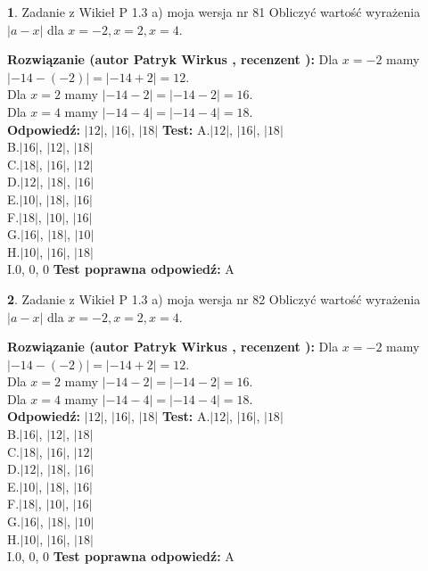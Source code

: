 \documentclass[12pt, a4paper]{article}
\theoremstyle{definition} %
\newtheorem{zad}{}
\newcommand{\zadStart}[1]{\begin{zad}#1\newline}
\newcommand{\zadStop}{\end{zad}}
\newcommand{\rozwStart}[2]{\noindent \textbf{Rozwiązanie (autor #1 , recenzent #2): }\newline}
\newcommand{\rozwStop}{\newline}
\newcommand{\odpStart}{\noindent \textbf{Odpowiedź:}\newline}
\newcommand{\odpStop}{\newline}
\newcommand{\testStart}{\noindent \textbf{Test:}\newline}
\newcommand{\testStop}{\newline}
\newcommand{\kluczStart}{\noindent \textbf{Test poprawna odpowiedź:}\newline}
\newcommand{\kluczStop}{\newline}
\begin{document}
\zadStart{Zadanie z Wikieł P 1.3 a) moja wersja nr 81}
Obliczyć wartość wyrażenia $|a - x|$ dla $x=-2,x=2,x=4$.
\zadStop
\rozwStart{Patryk Wirkus}{}
Dla $x = -2$ mamy $|-14 - (-2)| = |-14 + 2| = 12$.\\
Dla $x = 2$ mamy $|-14 - 2| = |-14 - 2| = 16$.\\
Dla $x = 4$ mamy $|-14 - 4| = |-14 - 4| = 18$.\\
\rozwStop
\odpStart
$|12|$, $|16|$, $|18|$
\odpStop
\testStart
A.$|12|$, $|16|$, $|18|$\\
B.$|16|$, $|12|$, $|18|$\\
C.$|18|$, $|16|$, $|12|$\\
D.$|12|$, $|18|$, $|16|$\\
E.$|10|$, $|18|$, $|16|$\\
F.$|18|$, $|10|$, $|16|$\\
G.$|16|$, $|18|$, $|10|$\\
H.$|10|$, $|16|$, $|18|$\\
I.$0$, $0$, $0$
\testStop
\kluczStart
A
\kluczStop



\zadStart{Zadanie z Wikieł P 1.3 a) moja wersja nr 82}
Obliczyć wartość wyrażenia $|a - x|$ dla $x=-2,x=2,x=4$.
\zadStop
\rozwStart{Patryk Wirkus}{}
Dla $x = -2$ mamy $|-14 - (-2)| = |-14 + 2| = 12$.\\
Dla $x = 2$ mamy $|-14 - 2| = |-14 - 2| = 16$.\\
Dla $x = 4$ mamy $|-14 - 4| = |-14 - 4| = 18$.\\
\rozwStop
\odpStart
$|12|$, $|16|$, $|18|$
\odpStop
\testStart
A.$|12|$, $|16|$, $|18|$\\
B.$|16|$, $|12|$, $|18|$\\
C.$|18|$, $|16|$, $|12|$\\
D.$|12|$, $|18|$, $|16|$\\
E.$|10|$, $|18|$, $|16|$\\
F.$|18|$, $|10|$, $|16|$\\
G.$|16|$, $|18|$, $|10|$\\
H.$|10|$, $|16|$, $|18|$\\
I.$0$, $0$, $0$
\testStop
\kluczStart
A
\kluczStop
\end{document}
